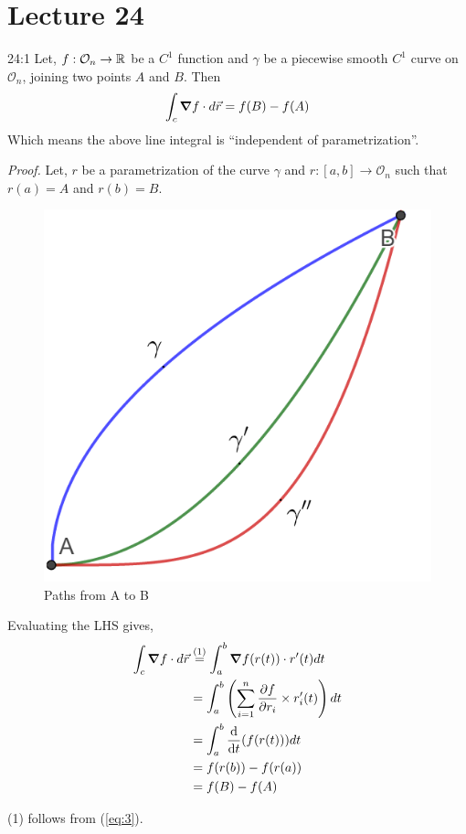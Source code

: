 \documentclass[../Analysis-3.tex]{subfiles}
\begin{document}
\chapter*{Lecture 24} %
\setcounter{chapter}{24} %
\setcounter{section}{0}

\begin{Thm}{}{24:1}
  Let, $f: \mathcal{O}_n \to \mathbb{R}$ be a $C^1$ function and $\gamma$ be a piecewise smooth $C^1$ curve on $\mathcal{O}_n$, joining two points $A$ and $B$. Then
  \[\int_c \grad f\cdot d\vec{r} = f(B)-f(A)\]
  Which means the above line integral is ``independent of parametrization''.
\end{Thm}

\textit{Proof.} Let, $r$ be a parametrization of the curve $\gamma$ and $r :[a,b] \to \mathcal{O}_n$ such that $r(a)=A$ and $r(b)=B$.

\begin{figure}
  \centering
  \includegraphics[width=.78\linewidth]{../figures/lec-24.1.png}
  \caption{Paths from A to B}
\end{figure}

Evaluating the LHS gives,
\begin{align*}
  \int_c \grad f\cdot d\vec{r}
   & \overset{\mathrm{(1)}}{=} \int_a^b \grad f(r(t)) \cdot r'(t) dt       \\
   & = \int_a^b \left(\sum_{i=1}^{n} \pdv{f}{r_i}\times r_i'(t) \right) dt \\
   & =\int_a^b \dv{t}(f(r(t))) dt                                          \\
   & = f(r(b)) - f(r(a))                                                   \\
   & = f(B) - f(A)
\end{align*}
\begin{center}
  (1) follows from (\ref{eq:3}).
\end{center}
\end{document}
